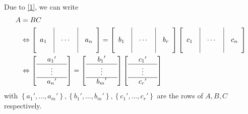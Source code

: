 \documentclass[a4paper,oneside]{book}
\numberwithin{equation}{chapter}
\begin{document}
Due to \eqref{1}, we can write
\begin{align}
\label{1.6}
A &= BC\\
& \Leftrightarrow \left[ {\begin{array}{*{20}{c}}
{}&\vline& {}&\vline& {}\\
{{a_1}}&\vline&  \cdots &\vline& {{a_n}}\\
{}&\vline& {}&\vline& {}
\end{array}} \right] = \left[ {\begin{array}{*{20}{c}}
{}&\vline& {}&\vline& {}\\
{{b_1}}&\vline&  \cdots &\vline& {{b_r}}\\
{}&\vline& {}&\vline& {}
\end{array}} \right]\left[ {\begin{array}{*{20}{c}}
{}&\vline& {}&\vline& {}\\
{{c_1}}&\vline&  \cdots &\vline& {{c_n}}\\
{}&\vline& {}&\vline& {}
\end{array}} \right]\\
 &\Leftrightarrow \left[ {\begin{array}{*{20}{c}}
{}&{{a_1}'}&{}\\
\hline
{}& \vdots &{}\\
\hline
{}&{{a_n}'}&{}
\end{array}} \right] = \left[ {\begin{array}{*{20}{c}}
{}&{{b_1}'}&{}\\
\hline
{}& \vdots &{}\\
\hline
{}&{{b_m}'}&{}
\end{array}} \right]\left[ {\begin{array}{*{20}{c}}
{}&{{c_1}'}&{}\\
\hline
{}& \vdots &{}\\
\hline
{}&{{c_r}'}&{}
\end{array}} \right]
\end{align}
with $\left\{ {{a_1}', \ldots ,{a_m}'} \right\},\left\{ {{b_1}', \ldots ,{b_m}'} \right\},\left\{ {{c_1}', \ldots ,{c_r}'} \right\}$ are the rows of $A,B,C$ respectively.
\end{document}
